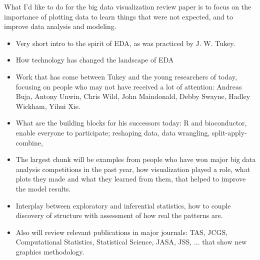 \documentclass{article}
\begin{document}
What I'd like to do for the big data visualization review paper is to focus on the importance of plotting data to learn things that were not expected, and to improve data analysis and modeling.

\begin{itemize} \itemsep 0in
\item Very short intro to the spirit of EDA, as was practiced by J. W. Tukey.

\item How technology has changed the landscape of EDA

\item Work that has come between Tukey and the young researchers of today, focusing on people who may not have received a lot of attention: Andreas Buja, Antony Unwin, Chris Wild, John Maindonald, Debby Swayne, Hadley Wickham, Yihui Xie.

\item What are the building blocks for his successors today: R and bioconductor, enable everyone to participate; reshaping data, data wrangling, split-apply-combine,

\item The largest chunk will be examples from people who have won major big data analysis competitions in the past year, how visualization played a role,  what plots they made and what they learned from them, that helped to improve the model results.

\item Interplay between exploratory and inferential statistics, how to couple discovery of structure with assessment of how real the patterns are.

\item Also will review relevant publications in major journals: TAS, JCGS, Computational Statistics, Statistical Science, JASA, JSS, ... that show new graphics methodology.

\end{itemize}



\end{document}
